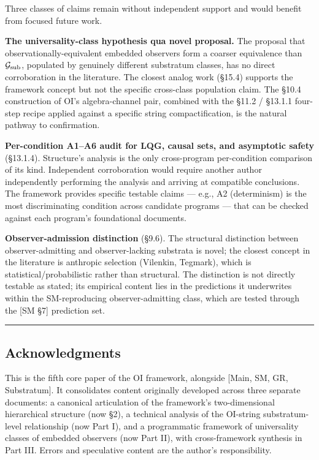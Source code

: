 \documentclass[
]{article}
\begin{document}
Three classes of claims remain without independent support and would
benefit from focused future work.

\textbf{The universality-class hypothesis qua novel proposal.} The
proposal that observationally-equivalent embedded observers form a
coarser equivalence than \(\mathcal{G}_{\rm sub}\), populated by
genuinely different substratum classes, has no direct corroboration in
the literature. The closest analog work (§15.4) supports the framework
concept but not the specific cross-class population claim. The §10.4
construction of OI's algebra-channel pair, combined with the §11.2 /
§13.1.1 four-step recipe applied against a specific string
compactification, is the natural pathway to confirmation.

\textbf{Per-condition A1--A6 audit for LQG, causal sets, and asymptotic
safety} (§13.1.4). Structure's analysis is the only cross-program
per-condition comparison of its kind. Independent corroboration would
require another author independently performing the analysis and
arriving at compatible conclusions. The framework provides specific
testable claims --- e.g., A2 (determinism) is the most discriminating
condition across candidate programs --- that can be checked against each
program's foundational documents.

\textbf{Observer-admission distinction} (§9.6). The structural
distinction between observer-admitting and observer-lacking substrata is
novel; the closest concept in the literature is anthropic selection
(Vilenkin, Tegmark), which is statistical/probabilistic rather than
structural. The distinction is not directly testable as stated; its
empirical content lies in the predictions it underwrites within the
SM-reproducing observer-admitting class, which are tested through the
{[}SM §7{]} prediction set.

\begin{center}\rule{0.5\linewidth}{0.5pt}\end{center}

\hypertarget{acknowledgments}{%
\subsection{Acknowledgments}\label{acknowledgments}}

This is the fifth core paper of the OI framework, alongside {[}Main, SM,
GR, Substratum{]}. It consolidates content originally developed across
three separate documents: a canonical articulation of the framework's
two-dimensional hierarchical structure (now §2), a technical analysis of
the OI-string substratum-level relationship (now Part I), and a
programmatic framework of universality classes of embedded observers
(now Part II), with cross-framework synthesis in Part III. Errors and
speculative content are the author's responsibility.
\end{document}
